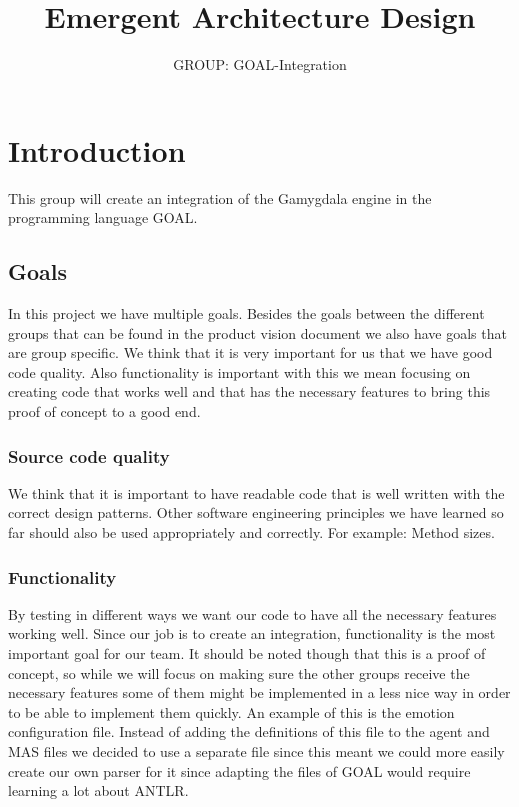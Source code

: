 \documentclass[]{article}
\title{Emergent Architecture Design}
\author{GROUP: GOAL-Integration}
\begin{document}
\maketitle

\section{Introduction}
This group will create an integration of the \gls{Gamygdala} engine in the programming language \gls{GOAL}.
\subsection{Goals}
In this project we have multiple goals. Besides the goals between the different groups that can be found in the product vision document we also have goals that are group specific. We think that it is very important for us that we have good code quality. Also functionality is important with this we mean focusing on creating code that works well and that has the necessary features to bring this proof of concept to a good end.

\subsubsection{Source code quality}
We think that it is important to have readable code that is well written with the correct design patterns. Other software engineering principles we have learned so far should also be used appropriately and correctly. For example: Method sizes.

\subsubsection{Functionality}
By testing in different ways we want our code to have all the necessary features working well. Since our job is to create an integration, functionality is the most important goal for our team. It should be noted though that this is a proof of concept, so while we will focus on making sure the other groups receive the necessary features some of them might be implemented in a less nice way in order to be able to implement them quickly. An example of this is the emotion configuration file. Instead of adding the definitions of this file to the agent and MAS files we decided to use a separate file since this meant we could more easily create our own parser for it since adapting the files of GOAL would require learning a lot about \gls{ANTLR}.
\end{document}
